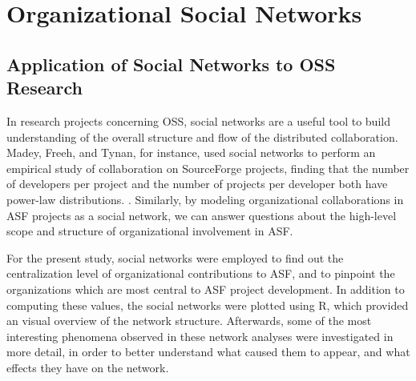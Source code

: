 \chapter{Organizational Social Networks}
\section{Application of Social Networks to OSS Research}
In research projects concerning OSS, social networks are a useful tool to build understanding of the overall structure and flow of the distributed collaboration. Madey, Freeh, and Tynan\cite{madey2002open}, for instance, used social networks to perform an empirical study of collaboration on SourceForge projects, finding that the number of developers per project and the number of projects per developer both have power-law distributions.
. 
 Similarly, by modeling organizational collaborations in ASF projects as a social network, we can answer questions about the high-level scope and structure of organizational involvement in ASF. 

For the present study, social networks were employed to find out the centralization level of organizational contributions to ASF, and to pinpoint the organizations which are most central to ASF project development. In addition to computing these values, the social networks were plotted using R, which provided an visual overview of the network structure. Afterwards, some of the most interesting phenomena observed in these network analyses were investigated in more detail, in order to better understand what caused them to appear, and what effects they have on the network.
